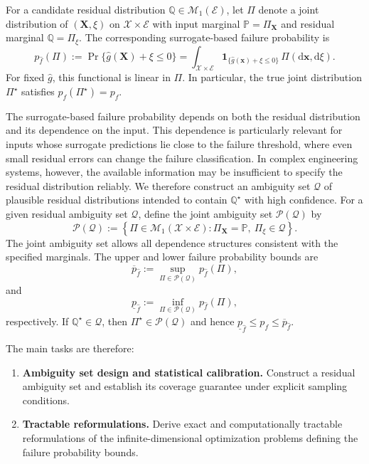 \documentclass[review,11pt,3p,authoryear,nopreprintline]{elsarticle}
\begin{document}
For a candidate residual distribution $\mathbb Q\in\mathcal M_1(\mathcal E)$, let $\Pi$ denote a joint distribution of $(\bm X,\xi)$ on $\mathcal X\times\mathcal E$ with input marginal $\mathbb P = \Pi_{\bm X}$ and residual marginal $\mathbb Q = \Pi_{\xi}$. The corresponding surrogate-based failure probability is
\begin{equation}
  p_{\hat f}(\Pi):=\Pr\{\hat g(\bm X)+\xi\le0\}=\int_{\mathcal X\times\mathcal E}\mathbf 1_{\{\hat g(\bm x)+\xi\le0\}}\,\Pi(\mathrm d\bm x,\mathrm d\xi).
  \label{eq-surrogate-failure-probability}
\end{equation}
For fixed $\hat g$, this functional is linear in $\Pi$. In particular, the true joint distribution $\Pi^\star$ satisfies $p_{\hat f}(\Pi^\star)=p_f$.

The surrogate-based failure probability depends on both the residual distribution and its dependence on the input. This dependence is particularly relevant for inputs whose surrogate predictions lie close to the failure threshold, where even small residual errors can change the failure classification. In complex engineering systems, however, the available information may be insufficient to specify the residual distribution reliably. We therefore construct an ambiguity set $\mathcal Q$ of plausible residual distributions intended to contain $\mathbb Q^\star$ with high confidence. For a given residual ambiguity set $\mathcal Q$, define the joint ambiguity set $\mathcal P(\mathcal Q)$ by
\[
  \mathcal P(\mathcal Q) :=\left\{\Pi\in\mathcal M_1(\mathcal X\times\mathcal E):\Pi_{\bm X}=\mathbb P,\ \Pi_\xi\in\mathcal Q\right\}.
\]
The joint ambiguity set allows all dependence structures consistent with the specified marginals. The upper and lower failure probability bounds are
\begin{equation}
  \overline p_{\hat f}:=\sup_{\Pi\in\mathcal P(\mathcal Q)}p_{\hat f}(\Pi),
  \label{eq-upper-bound}
\end{equation}
and
\begin{equation}
  \underline p_{\hat f}:=\inf_{\Pi\in\mathcal P(\mathcal Q)}p_{\hat f}(\Pi),
  \label{eq-lower-bound}
\end{equation}
respectively. If $\mathbb Q^\star\in\mathcal Q$, then $\Pi^\star\in\mathcal P(\mathcal Q)$ and hence $\underline p_{\hat f}\le p_f\le\overline p_{\hat f}$.

The main tasks are therefore:
\begin{enumerate}
  \item \textbf{Ambiguity set design and statistical calibration.} Construct a residual ambiguity set and establish its coverage guarantee under explicit sampling conditions.
  \item \textbf{Tractable reformulations.} Derive exact and computationally tractable reformulations of the infinite-dimensional optimization problems defining the failure probability bounds.
\end{enumerate}
\end{document}
